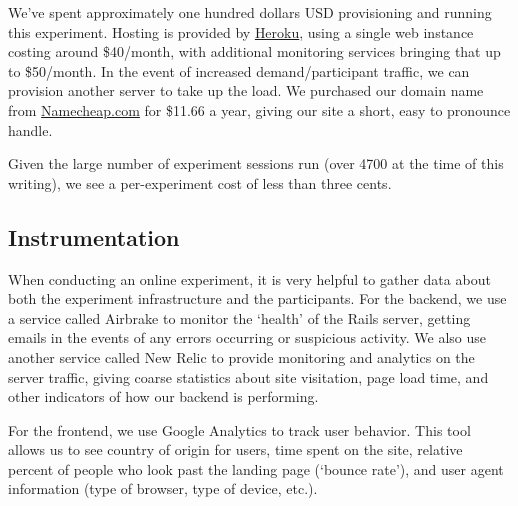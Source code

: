 We've spent approximately one hundred dollars USD provisioning and running this experiment. Hosting is provided by \href{Heroku.com}{Heroku}, using a single web instance costing around \$40/month, with additional monitoring services bringing that up to \$50/month. In the event of increased demand/participant traffic, we can provision another server to take up the load.
We purchased our domain name from \href{Namecheap.com}{Namecheap.com} for \$11.66 a year, giving our site a short, easy to pronounce handle.


Given the large number of experiment sessions run (over 4700 at the time of this writing), we see a per-experiment cost of less than three cents.

\subsection{Instrumentation}

When conducting an online experiment, it is very helpful to gather data about both the experiment infrastructure and the participants. For the backend, we use a service called Airbrake to monitor the `health' of the Rails server, getting emails in the events of any errors occurring or suspicious activity. We also use another service called New Relic to provide monitoring and analytics on the server traffic, giving coarse statistics about site visitation, page load time, and other indicators of how our backend is performing.

For the frontend, we use Google Analytics to track user behavior. This tool allows us to see country of origin for users, time spent on the site, relative percent of people who look past the landing page (`bounce rate'), and user agent information (type of browser, type of device, etc.).
